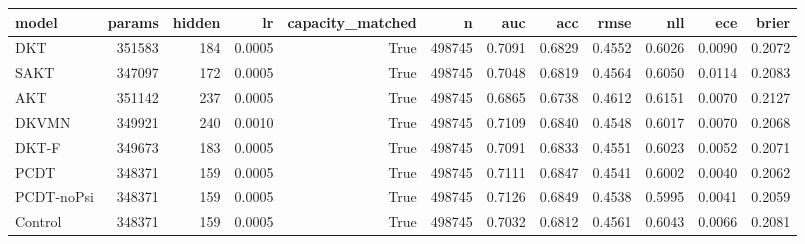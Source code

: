 \begin{tabular}{lrrrrrrrrrrr}
\toprule
model & params & hidden & lr & capacity\_matched & n & auc & acc & rmse & nll & ece & brier \\
\midrule
DKT & 351583 & 184 & 0.0005 & True & 498745 & 0.7091 & 0.6829 & 0.4552 & 0.6026 & 0.0090 & 0.2072 \\
SAKT & 347097 & 172 & 0.0005 & True & 498745 & 0.7048 & 0.6819 & 0.4564 & 0.6050 & 0.0114 & 0.2083 \\
AKT & 351142 & 237 & 0.0005 & True & 498745 & 0.6865 & 0.6738 & 0.4612 & 0.6151 & 0.0070 & 0.2127 \\
DKVMN & 349921 & 240 & 0.0010 & True & 498745 & 0.7109 & 0.6840 & 0.4548 & 0.6017 & 0.0070 & 0.2068 \\
DKT-F & 349673 & 183 & 0.0005 & True & 498745 & 0.7091 & 0.6833 & 0.4551 & 0.6023 & 0.0052 & 0.2071 \\
PCDT & 348371 & 159 & 0.0005 & True & 498745 & 0.7111 & 0.6847 & 0.4541 & 0.6002 & 0.0040 & 0.2062 \\
PCDT-noPsi & 348371 & 159 & 0.0005 & True & 498745 & 0.7126 & 0.6849 & 0.4538 & 0.5995 & 0.0041 & 0.2059 \\
Control & 348371 & 159 & 0.0005 & True & 498745 & 0.7032 & 0.6812 & 0.4561 & 0.6043 & 0.0066 & 0.2081 \\
\bottomrule
\end{tabular}
